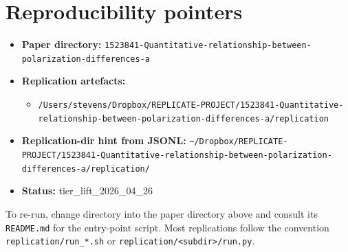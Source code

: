 \documentclass[11pt]{article}
\begin{document}
\section{Reproducibility pointers}\label{sec:repro}
\begin{itemize}
\item \textbf{Paper directory:} \texttt{1523841-Quantitative-relationship-between-polarization-differences-a}
\item \textbf{Replication artefacts:}
\begin{itemize}
\item \texttt{/Users/stevens/Dropbox/REPLICATE-PROJECT/1523841-Quantitative-relationship-between-polarization-differences-a/replication}
\end{itemize}
\item \textbf{Replication-dir hint from JSONL:} \texttt{\textasciitilde{}/Dropbox/REPLICATE-PROJECT/1523841-Quantitative-relationship-between-polarization-differences-a/replication/}
\item \textbf{Status:} tier\_lift\_2026\_04\_26
\end{itemize}

To re-run, change directory into the paper directory above and consult its \texttt{README.md} for the entry-point script. Most replications follow the convention \texttt{replication/run\_*.sh} or \texttt{replication/<subdir>/run.py}.
\end{document}

